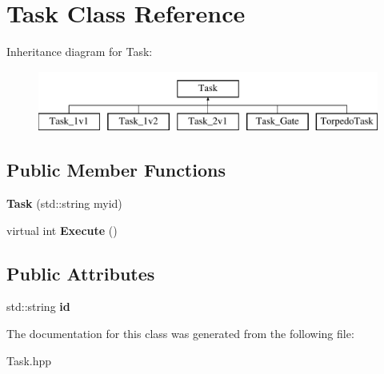 \hypertarget{classTask}{\section{\-Task \-Class \-Reference}
\label{classTask}
}
\-Inheritance diagram for \-Task\-:\begin{figure}[H]
\begin{center}
\leavevmode
\includegraphics[height=2.000000cm]{classTask}
\end{center}
\end{figure}
\subsection*{\-Public \-Member \-Functions}
\begin{DoxyCompactItemize}
\item 
\hypertarget{classTask_ab102ea182b6b5b85050522bd74701a87}{{\bfseries \-Task} (std\-::string myid)}\label{classTask_ab102ea182b6b5b85050522bd74701a87}

\item 
\hypertarget{classTask_ab7918acd8ddd455e5dac8ced9f26534a}{virtual int {\bfseries \-Execute} ()}\label{classTask_ab7918acd8ddd455e5dac8ced9f26534a}

\end{DoxyCompactItemize}
\subsection*{\-Public \-Attributes}
\begin{DoxyCompactItemize}
\item 
\hypertarget{classTask_a883535f7a13c85d46f19c240cf5e3026}{std\-::string {\bfseries id}}\label{classTask_a883535f7a13c85d46f19c240cf5e3026}

\end{DoxyCompactItemize}


\-The documentation for this class was generated from the following file\-:\begin{DoxyCompactItemize}
\item 
\-Task.\-hpp\end{DoxyCompactItemize}
